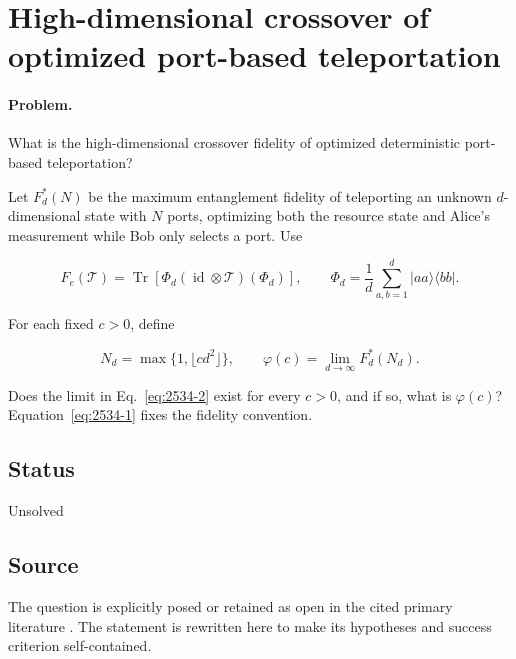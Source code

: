 \section{High-dimensional crossover of optimized port-based teleportation}
\label{sec:op_25342dbb8d64e728}

\paragraph{Problem.}
What is the high-dimensional crossover fidelity of optimized deterministic port-based teleportation?

Let $F_d^*(N)$ be the maximum entanglement fidelity of teleporting an unknown $d$-dimensional state with $N$ ports, optimizing both the resource state and Alice's measurement while Bob only selects a port. Use

\begin{equation}
F_e(\mathcal T)=\operatorname{Tr}\!\left[\Phi_d(\operatorname{id}\otimes\mathcal T)(\Phi_d)\right],
\qquad
\Phi_d=\frac1d\sum_{a,b=1}^d|aa\rangle\langle bb|.
\label{eq:2534-1}
\end{equation}

For each fixed $c>0$, define

\begin{equation}
N_d=\max\{1,\lfloor cd^2\rfloor\},
\qquad
\varphi(c)=\lim_{d\to\infty}F_d^*(N_d).
\label{eq:2534-2}
\end{equation}

Does the limit in Eq.~\eqref{eq:2534-2} exist for every $c>0$, and if so, what is $\varphi(c)$? Equation~\eqref{eq:2534-1} fixes the fidelity convention.

\subsection*{Status}

Unsolved

\subsection*{Source}

The question is explicitly posed or retained as open in the cited primary literature .  The statement is rewritten here to make its hypotheses and success criterion self-contained.

